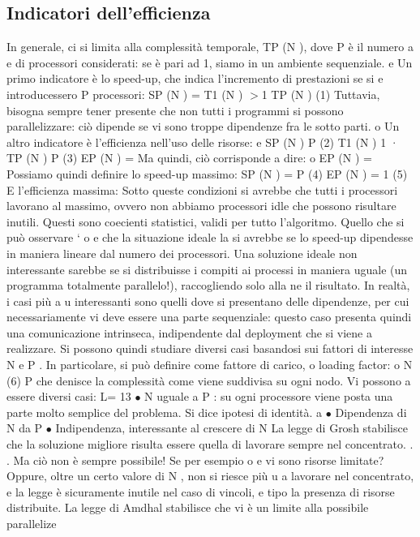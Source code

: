 \documentclass[a4paper,12pt]{article}
\begin{document}
\subsection{Indicatori dell'efficienza}
In generale, ci si limita alla complessità temporale, TP (N ), dove P è il numero
a
e
di processori considerati: se è pari ad 1, siamo in un ambiente sequenziale.
e
Un primo indicatore è lo speed-up, che indica l'incremento di prestazioni se si
e
introducessero P processori:
SP (N ) =
T1 (N )
$>$1
TP (N )
(1)
Tuttavia, bisogna sempre tener presente che non tutti i programmi si possono
parallelizzare: ciò dipende se vi sono troppe dipendenze fra le sotto parti.
o
Un altro indicatore è l'efficienza nell'uso delle risorse:
e
SP (N )
P
(2)
T1 (N ) 1
·
TP (N ) P
(3)
EP (N ) =
Ma quindi, ciò corrisponde a dire:
o
EP (N ) =
Possiamo quindi definire lo speed-up massimo:
SP (N ) = P
(4)
EP (N ) = 1
(5)
E l'efficienza massima:
Sotto queste condizioni si avrebbe che tutti i processori lavorano al massimo,
ovvero non abbiamo processori idle che possono risultare inutili. Questi sono
coecienti statistici, validi per tutto l'algoritmo. Quello che si può osservare `
o
e
che la situazione ideale la si avrebbe se lo speed-up dipendesse in maniera lineare dal numero dei processori. Una
soluzione ideale non interessante sarebbe
se si distribuisse i compiti ai processi in maniera uguale (un programma totalmente parallelo!), raccogliendo solo alla
ne il risultato. In realtà, i casi più
a
u
interessanti sono quelli dove si presentano delle dipendenze, per cui necessariamente vi deve essere una parte
sequenziale: questo caso presenta quindi una
comunicazione intrinseca, indipendente dal deployment che si viene a realizzare.
Si possono quindi studiare diversi casi basandosi sui fattori di interesse N e
P . In particolare, si può definire come fattore di carico, o loading factor:
o
N
(6)
P
che denisce la complessità come viene suddivisa su ogni nodo. Vi possono
a
essere diversi casi:
L=
13
$\bullet$ N uguale a P : su ogni processore viene posta una parte molto semplice
del problema. Si dice ipotesi di identità.
a
$\bullet$ Dipendenza di N da P
$\bullet$ Indipendenza, interessante al crescere di N
La legge di Grosh stabilisce che la soluzione migliore risulta essere quella di lavorare sempre nel concentrato. . . Ma
ciò non è sempre possibile! Se per esempio
o
e
vi sono risorse limitate? Oppure, oltre un certo valore di N , non si riesce più
u
a lavorare nel concentrato, e la legge è sicuramente inutile nel caso di vincoli,
e
tipo la presenza di risorse distribuite.
La legge di Amdhal stabilisce che vi è un limite alla possibile parallelize
\end{document}
